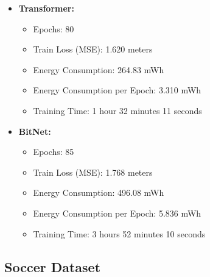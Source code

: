 \begin{itemize}
    \item \textbf{Transformer:} 
    \begin{itemize}
        \item Epochs: 80
        \item Train Loss (MSE): 1.620 meters
        \item Energy Consumption: 264.83 mWh
        \item Energy Consumption per Epoch: 3.310 mWh
        \item Training Time: 1 hour 32 minutes 11 seconds
    \end{itemize}
    
    \item \textbf{BitNet:} 
    \begin{itemize}
        \item Epochs: 85
        \item Train Loss (MSE): 1.768 meters
        \item Energy Consumption: 496.08 mWh
        \item Energy Consumption per Epoch: 5.836 mWh
        \item Training Time: 3 hours 52 minutes 10 seconds
    \end{itemize}
\end{itemize}

\subsection{Soccer Dataset}


